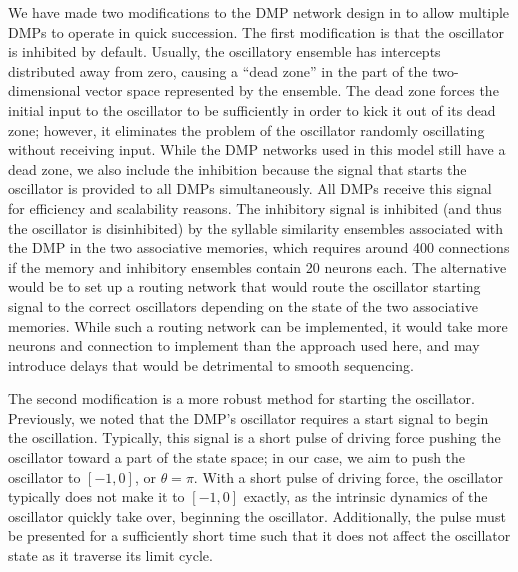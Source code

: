 We have made two modifications
to the DMP network design
in \cite{dewolf2014}
to allow multiple DMPs
to operate in quick succession.
The first modification
is that the oscillator is inhibited
by default.
Usually, the oscillatory ensemble
has intercepts distributed away from zero,
causing a ``dead zone'' in the part of the
two-dimensional vector space represented
by the ensemble.
The dead zone forces the initial input
to the oscillator
to be sufficiently
in order to kick it out of its dead zone;
however, it eliminates the problem
of the oscillator randomly
oscillating without receiving input.
While the DMP networks used in this model
still have a dead zone,
we also include the inhibition
because the signal that
starts the oscillator is provided
to all DMPs simultaneously.
All DMPs receive this signal
for efficiency and scalability reasons.
The inhibitory signal is inhibited
(and thus the oscillator is disinhibited)
by the syllable similarity ensembles
associated with the DMP
in the two associative memories,
which requires around 400 connections
if the memory and inhibitory ensembles
contain 20 neurons each.
The alternative would be to
set up a routing network
that would route the oscillator starting signal
to the correct oscillators depending on
the state of the two associative memories.
While such a routing network can be implemented,
it would take more neurons and connection
to implement than the approach used here,
and may introduce delays that
would be detrimental to smooth sequencing.

The second modification is a more robust
method for starting the oscillator.
Previously, we noted that the DMP's oscillator
requires a start signal to begin
the oscillation.
Typically, this signal is a short pulse
of driving force pushing the oscillator
toward a part of the state space;
in our case, we aim to push the oscillator
to $[-1, 0]$, or $\theta=\pi$.
With a short pulse of driving force,
the oscillator typically does not
make it to $[-1, 0]$ exactly,
as the intrinsic dynamics of the oscillator
quickly take over,
beginning the oscillator.
Additionally, the pulse
must be presented for a sufficiently short time
such that it does not affect
the oscillator state as it traverse
its limit cycle.

